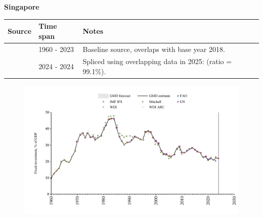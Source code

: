 \documentclass[12pt,a4paper,landscape]{article}
\begin{document}
\begin{adjustbox}{max totalsize={\paperwidth}{\paperheight},center}
\begin{minipage}[t][\textheight][t]{\textwidth}
\vspace*{0.5cm}
{}
\begin{center}
{\Large\bfseries Singapore}
\end{center}
\vspace{0.5cm}
\begin{table}[H]
\centering
\small
\begin{tabular}{|l|l|l|}
\hline
\textbf{Source} & \textbf{Time span} & \textbf{Notes} \\
\hline
\rowcolor{white}\cite{WDI}& 1960 - 2023 &Baseline source, overlaps with base year 2018.\\
\rowcolor{lightgray}\cite{IMF_IFS}& 2024 - 2024 &Spliced using overlapping data in 2025: (ratio = 99.1\%).\\
\hline
\end{tabular}
\end{table}
\begin{figure}[H]
\centering
\includegraphics[width=\textwidth,height=0.6\textheight,keepaspectratio]{graphs/SGP_finv_GDP.pdf}
\end{figure}
\end{minipage}
\end{adjustbox}
\end{document}
